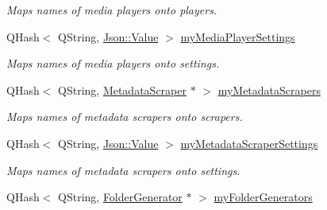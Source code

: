 \begin{DoxyCompactItemize}
\begin{DoxyCompactList}\small\item\em Maps names of media players onto players. \end{DoxyCompactList}\item 
\hypertarget{class_a_w_e_1_1_global_settings_ab489a11d7f94b7aed94440f08da2fdec}{Q\-Hash$<$ Q\-String, \hyperlink{class_json_1_1_value}{Json\-::\-Value} $>$ \hyperlink{class_a_w_e_1_1_global_settings_ab489a11d7f94b7aed94440f08da2fdec}{my\-Media\-Player\-Settings}}\label{class_a_w_e_1_1_global_settings_ab489a11d7f94b7aed94440f08da2fdec}

\begin{DoxyCompactList}\small\item\em Maps names of media players onto settings. \end{DoxyCompactList}\item 
\hypertarget{class_a_w_e_1_1_global_settings_a023c78a367d36843543b4343fea55014}{Q\-Hash$<$ Q\-String, \hyperlink{class_a_w_e_1_1_metadata_scraper}{Metadata\-Scraper} $\ast$ $>$ \hyperlink{class_a_w_e_1_1_global_settings_a023c78a367d36843543b4343fea55014}{my\-Metadata\-Scrapers}}\label{class_a_w_e_1_1_global_settings_a023c78a367d36843543b4343fea55014}

\begin{DoxyCompactList}\small\item\em Maps names of metadata scrapers onto scrapers. \end{DoxyCompactList}\item 
\hypertarget{class_a_w_e_1_1_global_settings_aa7c418d74dff8c4bf6008c7dab80ebaf}{Q\-Hash$<$ Q\-String, \hyperlink{class_json_1_1_value}{Json\-::\-Value} $>$ \hyperlink{class_a_w_e_1_1_global_settings_aa7c418d74dff8c4bf6008c7dab80ebaf}{my\-Metadata\-Scraper\-Settings}}\label{class_a_w_e_1_1_global_settings_aa7c418d74dff8c4bf6008c7dab80ebaf}

\begin{DoxyCompactList}\small\item\em Maps names of metadata scrapers onto settings. \end{DoxyCompactList}\item 
\hypertarget{class_a_w_e_1_1_global_settings_a5733aead5bc3ff476f5abfb65906f361}{Q\-Hash$<$ Q\-String, \hyperlink{class_a_w_e_1_1_folder_generator}{Folder\-Generator} $\ast$ $>$ \hyperlink{class_a_w_e_1_1_global_settings_a5733aead5bc3ff476f5abfb65906f361}{my\-Folder\-Generators}}\label{class_a_w_e_1_1_global_settings_a5733aead5bc3ff476f5abfb65906f361}


\end{DoxyCompactItemize}
